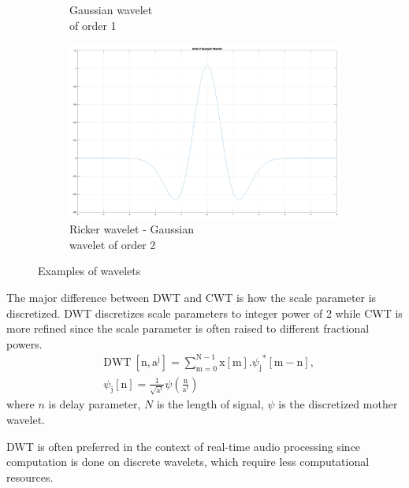 \begin{enumerate}
\begin{figure}
\begin{subfigure}{.4\textwidth}
            \caption{Gaussian wavelet \\of order 1}
            \label{order1}
        \end{subfigure}
        \hfill
        \begin{subfigure}{.4\textwidth}
          \centering
          \includegraphics[width=\linewidth]{Figures/order2gaussian.png}
          \caption{Ricker wavelet - Gaussian \\wavelet of order 2}
          \label{Ricker}
        \end{subfigure}

        \caption{Examples of wavelets}
        \label{fig:test}
    \end{figure}
    
    The major difference between DWT and CWT is how the scale parameter is discretized. DWT discretizes scale parameters to integer power of 2 while CWT is more refined since 
    the scale parameter is often raised to different fractional powers.
    \begin{align*} &\text{DWT}\ [\mathrm{n},\mathrm{a}^{\mathrm{j}}]=\sum_{\mathrm{m}=0}^{\mathrm{N}-1}\mathrm{x}[\mathrm{m}].{\psi_{\mathrm{j}}}^{*}[\mathrm{m}-\mathrm{n}],\\ &\psi_{\mathrm{j}}[\mathrm{n}]=\frac{1}{\sqrt{\mathrm{a}^{\mathrm{f}}}}\psi\left(\frac{\mathrm{n}}{\mathrm{a}^{\mathrm{f}}}\right) \tag{2} \end{align*}
    where \(n\) is delay parameter, \(N\) is the length of signal, \(\psi\) is the discretized mother wavelet. 

    DWT is often preferred in the context of real-time audio processing since computation is done on discrete wavelets, which require less computational resources.
    

\end{enumerate}
